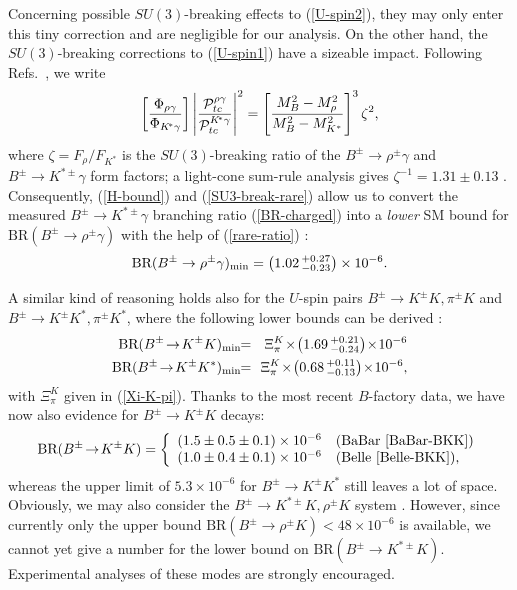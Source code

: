 \documentclass[11pt]{cernrep}
\begin{document}
Concerning possible $SU(3)$-breaking effects to (\ref{U-spin2}), they 
may only enter this tiny correction and are negligible for our analysis. 
On the other hand, the $SU(3)$-breaking corrections to (\ref{U-spin1}) 
have a sizeable impact. Following Refs.~\cite{ALP-rare,BoBu}, we write
\begin{equation}\label{SU3-break-rare}
\left[\frac{\Phi_{\rho\gamma}}{\Phi_{K\!^\ast\gamma}}\right]
\left|\frac{{\cal P}_{tc}^{\rho\gamma}}{{\cal P}_{tc}^{K\!^\ast\gamma}}
\right|^2=\left[\frac{M_B^2-M_\rho^2}{M_B^2-M_{K^\ast}^2}\right]^3
\zeta^2,
\end{equation}
where $\zeta=F_\rho/F_{K^\ast}$ is the $SU(3)$-breaking ratio of the
$B^\pm\to\rho^\pm\gamma$ and $B^\pm\to K^{\ast\pm}\gamma$ form factors; a 
light-cone sum-rule analysis gives $\zeta^{-1}=1.31\pm0.13$ \cite{Ball-Braun}.
Consequently, (\ref{H-bound}) and (\ref{SU3-break-rare}) allow us to convert 
the measured $B^\pm\to K^{\ast\pm}\gamma$ branching ratio (\ref{BR-charged}) 
into a {\it lower} SM bound for 
$\mbox{BR}(B^\pm\to\rho^\pm\gamma)$ with the help of (\ref{rare-ratio}) \cite{FR2}:
\begin{equation}\label{Brhogam-char}
\mbox{BR}(B^\pm\to \rho^\pm\gamma)_{\rm min}=\left(1.02\,^{+0.27}_{-0.23}
\right)\times10^{-6}.
\end{equation}

A similar kind of reasoning holds also for the $U$-spin 
pairs $B^\pm\to K^\pm K, \pi^\pm K$ and $B^\pm\to K^\pm K^\ast, \pi^\pm K^\ast$,
where the following lower bounds can be derived \cite{FR2}:
\begin{eqnarray}
\mbox{BR}(B^\pm\!\to\! K^\pm K)_{\rm min} \!\!&=&\!\! \Xi^K_\pi\!\times\!
\left(1.69\,^{+0.21}_{-0.24}\right)\!\times\! 10^{-6}\label{BKK-char}\\
\mbox{BR}(B^\pm\!\to\! K^\pm K^\ast)_{\rm min} \!\!&=&\!\! \Xi^K_\pi\!\times\!
\left(0.68\,^{+0.11}_{-0.13}
\right)\!\times \! 10^{-6},\label{BpiKast}
\end{eqnarray}
with $\Xi^K_\pi$ given in (\ref{Xi-K-pi}). Thanks to the most recent
$B$-factory data, we have now also evidence for $B^\pm\to K^\pm K$
decays:
\begin{equation}
\mbox{BR}(B^\pm\!\to\! K^\pm K)=
\left\{\begin{array}{ll}
(1.5\pm0.5\pm0.1)\times 10^{-6} & \mbox{(BaBar \cite{BaBar-BKK})}\\
(1.0\pm0.4\pm0.1)\times 10^{-6} & \mbox{(Belle \cite{Belle-BKK}),}
\end{array} \right.
\end{equation}
whereas the upper limit of $5.3\times 10^{-6}$ for $B^\pm\to K^\pm K^\ast$
still leaves a lot of space. Obviously, we may also consider the
$B^\pm\to K^{\ast\pm} K, \rho^\pm K$ system \cite{FR2}. However,
since currently only the upper bound 
$\mbox{BR}(B^\pm\to \rho^\pm K)<48\times 10^{-6}$ is available, 
we cannot yet give a number for the lower bound on 
$\mbox{BR}(B^\pm\to K^{\ast\pm} K)$. Experimental analyses of
these modes are strongly encouraged.
\end{document}
